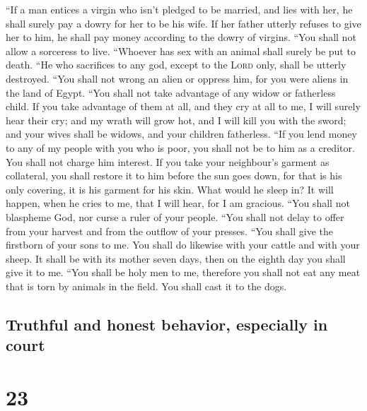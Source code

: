  ``If a man entices a virgin who isn't pledged to be
married, and lies with her, he shall surely pay a dowry for her to be
his wife.  If her father utterly refuses to give her to
him, he shall pay money according to the dowry of virgins.
 ``You shall not allow a sorceress to live.
 ``Whoever has sex with an animal shall surely be put to
death.  ``He who sacrifices to any god, except to the
\textsc{Lord} only, shall be utterly destroyed.  ``You
shall not wrong an alien or oppress him, for you were aliens in the land
of Egypt.  ``You shall not take advantage of any widow or
fatherless child.  If you take advantage of them at all,
and they cry at all to me, I will surely hear their cry; 
and my wrath will grow hot, and I will kill you with the sword; and your
wives shall be widows, and your children fatherless. 
``If you lend money to any of my people with you who is poor, you shall
not be to him as a creditor. You shall not charge him interest.
 If you take your neighbour's garment as collateral, you
shall restore it to him before the sun goes down,  for
that is his only covering, it is his garment for his skin. What would he
sleep in? It will happen, when he cries to me, that I will hear, for I
am gracious.  ``You shall not blaspheme God, nor curse a
ruler of your people.  ``You shall not delay to offer
from your harvest and from the outflow of your presses. ``You shall give
the firstborn of your sons to me.  You shall do likewise
with your cattle and with your sheep. It shall be with its mother seven
days, then on the eighth day you shall give it to me. 
``You shall be holy men to me, therefore you shall not eat any meat that
is torn by animals in the field. You shall cast it to the dogs.

\hypertarget{truthful-and-honest-behavior-especially-in-court}{%
\subsection{Truthful and honest behavior, especially in
court}\label{truthful-and-honest-behavior-especially-in-court}}

\hypertarget{section-22}{%
\section{23}\label{section-22}}

